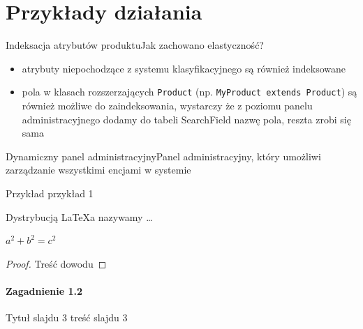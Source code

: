\documentclass[polish,xcolor=table,9pt,aspectratio=1610,hyperref={pdfpagemode=FullScreen}]{beamer}
\begin{document}
\part{Przykłady działania}
 
\begin{frame}{Indeksacja atrybutów produktu}{Jak zachowano elastyczność?}
\begin{itemize}
	\item<1-> atrybuty niepochodzące z systemu klasyfikacyjnego są również indeksowane
	\item<2-> pola w klasach rozszerzających \texttt{Product} (np. \texttt{MyProduct extends Product}) są również możliwe do zaindeksowania, wystarczy że z poziomu panelu administracyjnego dodamy do tabeli SearchField nazwę pola, reszta zrobi się sama
\end{itemize}
\end{frame}
\begin{frame}{Dynamiczny panel administracyjny}{Panel administracyjny, który umożliwi zarządzanie wszystkimi encjami w systemie}
\begin{exampleblock}{Przykład}
przykład 1
\end{exampleblock}
\begin{definition}
Dystrybucją \LaTeX a nazywamy \ldots
\end{definition}
\begin{theorem}[Pitagorasa]
$a^2+b^2=c^2$
\end{theorem}
\pause %
\begin{proof}
Treść dowodu
\end{proof}
\end{frame}

\subsection{Zagadnienie 1.2}

\begin{frame}{Tytuł slajdu 3}
treść slajdu 3
\end{frame}
\end{document}
